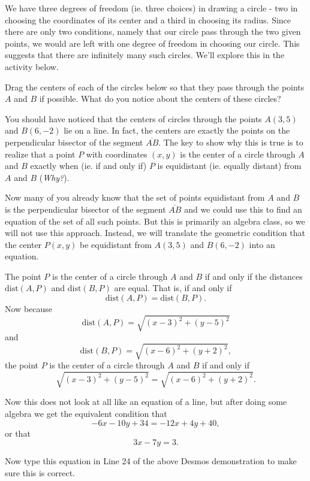 \documentclass{ximera}
\begin{document}
\begin{explanation}
We have three degrees of freedom (ie. three choices) in drawing a circle - two in choosing the coordinates of its center and a third in choosing its radius. Since there are only two conditions, namely that our circle pass through the two given points, we would are left with one degree of freedom in choosing our circle. This suggests that there are infinitely many such circles. We'll explore this in the activity below. 


\begin{exploration}\label{exp:circle1}
Drag the centers of each of the circles below so that they pass through the points $A$ and $B$ if possible. What do you notice about the centers of these circles?
 
 
\begin{onlineOnly}
    \begin{center}
\end{center}
\end{onlineOnly}
\end{exploration}

You should have noticed that the centers of circles through the points $A(3,5)$ and $B(6,-2)$ lie on a line. In fact, the centers are exactly the points on the perpendicular bisector of the segment $\overline{AB}$. The key to show why this is true is to realize that a point $P$ with coordinates $(x,y)$ is the center of a circle through $A$ and $B$ exactly when (ie. if and only if) $P$ is equidistant (ie. equally distant) from $A$ and $B$ (\emph{Why?}). 

Now many of you already know that the set of points equidistant from $A$ and $B$ is the perpendicular bisector of the segment $\overline{AB}$ and we could use this to find an equation of the set of all such points. But this is primarily an algebra class, so we will not use this approach. Instead, we will translate the geometric condition that the center $P(x,y)$ be equidistant from $A(3,5)$ and $B(6,-2)$ into an equation.

The point $P$ is the center of a circle through $A$ and $B$ if and only if the distances $\text{dist}(A,P)$ and $\text{dist}(B,P)$ are equal. That is, if and only if
\[
   \text{dist}(A,P)  = \text{dist}(B,P) .
\]
Now because
\[
   \text{dist}(A,P) = \sqrt{(x-3)^2 + (y-5)^2}
\] 
and
\[
  \text{dist}(B,P) = \sqrt{(x-6)^2 + (y+2)^2} ,
\]
the point $P$ is the center of a circle through $A$ and $B$ if and only if
\[
   \sqrt{(x-3)^2 + (y-5)^2} = \sqrt{(x-6)^2 + (y+2)^2} .
\]

Now this does not look at all like an equation of a line, but after doing some algebra we get the equivalent condition that
\[
      -6x -10y + 34 = -12x + 4y +40 ,
\] 
or that 
\[
    3x - 7y = 3 .
\]
 
Now type this equation in Line 24 of the above Desmos demonstration to make sure this is correct.

\end{explanation}
\end{document}
